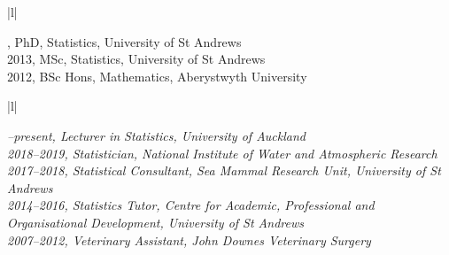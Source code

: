\documentclass[12pt, a4paper]{article}
\begin{document}
\vspace{-0.3 cm}

\begin{center}\begin{tabular}{|l|}
\hline {}   \\
\hline
\end{tabular}\end{center}
\vspace{-0.3 cm} {\it {


    , PhD, Statistics, University of St Andrews\\
    2013, MSc, Statistics, University of St Andrews\\
    2012, BSc Hons, Mathematics, Aberystwyth University
}\par}

\begin{center}\begin{tabular}{|l|}
\hline {}   \\
\hline
\end{tabular}\end{center}
\vspace{-0.3 cm} {\it {
    --present, Lecturer in Statistics, University of Auckland\\
    2018--2019, Statistician, National Institute of Water and Atmospheric Research\\
    2017--2018, Statistical Consultant, Sea Mammal Research Unit, University of St Andrews\\
    2014--2016, Statistics Tutor, Centre for Academic, Professional and Organisational Development, University of St Andrews\\
    2007--2012, Veterinary Assistant, John Downes Veterinary Surgery
}\par}
\end{document}
